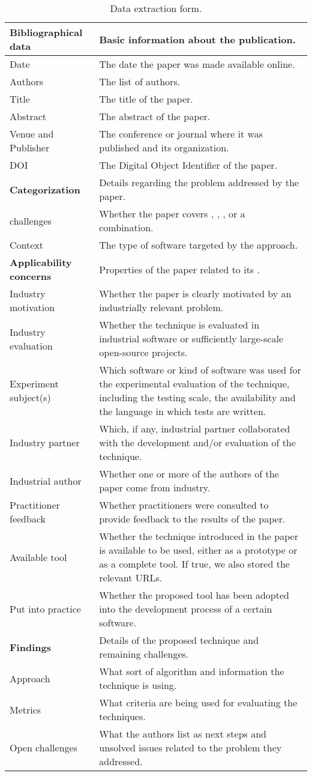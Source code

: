 \newcommand{\rowextraction}[2]{
#1 & %
#2 %
\\ }
\newcommand{\rowextractionheader}[2]{
\textbf{#1} & %
#2 %
\\ }

\begin{table}[]
\centering
\scriptsize
{}
\begin{tabular}{lp{}}
\toprule
\rowextractionheader{Bibliographical data}{Basic information about the publication.}
\midrule
\rowextraction{Date}{The date the paper was made available online.}
\rowextraction{Authors}{The list of authors.}
\rowextraction{Title}{The title of the paper.}
\rowextraction{Abstract}{The abstract of the paper.}
\rowextraction{Venue and Publisher}{The conference or journal where it was published and its organization.}
\rowextraction{DOI}{The Digital Object Identifier of the paper.}
\midrule
\rowextractionheader{Categorization}{Details regarding the problem addressed by the paper.}
\midrule
\rowextraction{\rt challenges}{Whether the paper covers \tcp, \tcs, \tsr, \tsa or a combination.}
\rowextraction{Context}{The type of software targeted by the approach.}
\midrule
\rowextractionheader{Applicability concerns}{Properties of the paper related to its \rea.}
\midrule
\rowextraction{Industry motivation}{Whether the paper is clearly motivated by an industrially relevant problem.}
\rowextraction{Industry evaluation}{Whether the technique is evaluated in industrial software or sufficiently large-scale open-source projects.}
\rowextraction{Experiment subject(s)}{Which software or kind of software was used for the experimental evaluation of the technique, including the testing scale, the availability and the language in which tests are written.}
\rowextraction{Industry partner}{Which, if any, industrial partner collaborated with the development and/or evaluation of the technique.}
\rowextraction{Industrial author}{Whether one or more of the authors of the paper come from industry.}
\rowextraction{Practitioner feedback}{Whether practitioners were consulted to provide feedback to the results of the paper.}
\rowextraction{Available tool}{Whether the technique introduced in the paper is available to be used, either as a prototype or as a complete tool. If true, we also stored the relevant URLs.}
\rowextraction{Put into practice}{Whether the proposed tool has been adopted into the development process of a certain software.}
\midrule
\rowextractionheader{Findings}{Details of the proposed technique and remaining challenges.}
\midrule
\rowextraction{Approach}{What sort of algorithm and information the technique is using.}
\rowextraction{Metrics}{What criteria are being used for evaluating the techniques.}
\rowextraction{Open challenges}{What the authors list as next steps and unsolved issues related to the problem they addressed.}
\bottomrule
\end{tabular}
\caption{Data extraction form.}
\label{table:extraction}
\end{table}
